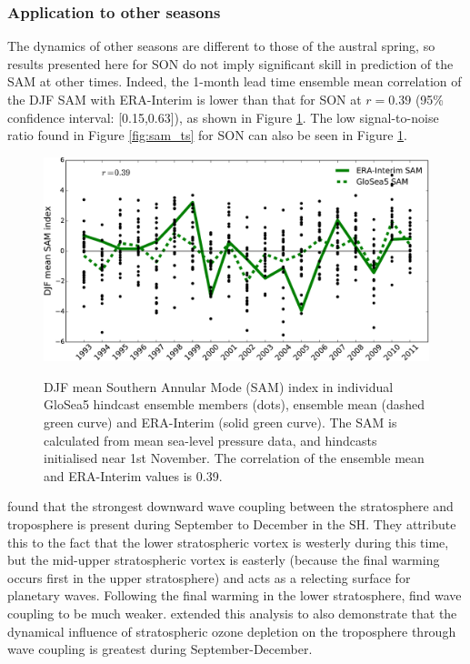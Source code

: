 \subsubsection{Application to other seasons}

The dynamics of other seasons are different to those of the austral spring, so
results presented here for SON do not imply significant skill in prediction of
the SAM at other times. Indeed, the 1-month lead time ensemble mean correlation
of the DJF SAM with ERA-Interim is lower than that for SON at $r=0.39$ (95\%
confidence interval: [0.15,0.63]), as shown in Figure \ref{fig:djf_sam_ts}. The
low signal-to-noise ratio found in Figure \ref{fig:sam_ts} for SON can also be
seen in Figure \ref{fig:djf_sam_ts}. 

\begin{figure}[t]
  \noindent\includegraphics[width=\textwidth,angle=0]{figures/chapter-seasonal/DJF_SAM.pdf}\\
  \caption[GloSea5 predictions of the SAM.]{DJF mean Southern Annular Mode (SAM)
    index in individual GloSea5 hindcast ensemble members (dots), ensemble mean
    (dashed green curve) and ERA-Interim (solid green curve). The SAM is
    calculated from mean sea-level pressure data, and hindcasts initialised near
    1st November. The correlation of the ensemble mean and ERA-Interim values is
    0.39.}\label{fig:djf_sam_ts}
\end{figure}

\citet{Shaw2010} found that the strongest downward wave coupling between the
stratosphere and troposphere is present during September to December in the
SH. They attribute this to the fact that the lower stratospheric vortex is
westerly during this time, but the mid-upper stratospheric vortex is easterly
(because the final warming occurs first in the upper stratosphere) and acts as a
relecting surface for planetary waves. Following the final warming in the lower
stratosphere, \citet{Shaw2010} find wave coupling to be much
weaker. \citet{Shaw2011} extended this analysis to also demonstrate that the
dynamical influence of stratospheric ozone depletion on the troposphere through
wave coupling is greatest during September-December.

